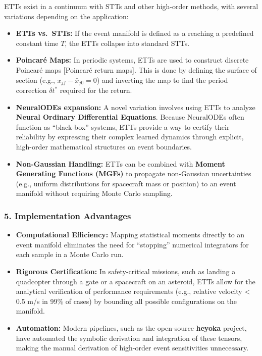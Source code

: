\documentclass[
  letterpaper,
  DIV=11,
  numbers=noendperiod,
  oneside]{scrartcl}
\begin{document}
ETTs exist in a continuum with STTs and other high-order methods, with
several variations depending on the application:

\begin{itemize}
\item
  \textbf{ETTs vs.~STTs:} If the event manifold is defined as a reaching
  a predefined constant time \(T\), the ETTs collapse into standard
  STTs.
\item
  \textbf{Poincaré Maps:} In periodic systems, ETTs are used to
  construct discrete Poincaré maps {[}Poincaré return maps{]}. This is
  done by defining the surface of section (e.g.,
  \(x_{jf} - \bar{x}_{j0} = 0\)) and inverting the map to find the
  period correction \(\delta t^*\) required for the return.
\item
  \textbf{NeuralODEs expansion:} A novel variation involves using ETTs
  to analyze \textbf{Neural Ordinary Differential Equations}. Because
  NeuralODEs often function as ``black-box'' systems, ETTs provide a way
  to certify their reliability by expressing their complex learned
  dynamics through explicit, high-order mathematical structures on event
  boundaries.
\item
  \textbf{Non-Gaussian Handling:} ETTs can be combined with
  \textbf{Moment Generating Functions (MGFs)} to propagate non-Gaussian
  uncertainties (e.g., uniform distributions for spacecraft mass or
  position) to an event manifold without requiring Monte Carlo sampling.
\end{itemize}

\subsubsection{5. Implementation
Advantages}\label{implementation-advantages}

\begin{itemize}
\item
  \textbf{Computational Efficiency:} Mapping statistical moments
  directly to an event manifold eliminates the need for ``stopping''
  numerical integrators for each sample in a Monte Carlo run.
\item
  \textbf{Rigorous Certification:} In safety-critical missions, such as
  landing a quadcopter through a gate or a spacecraft on an asteroid,
  ETTs allow for the analytical verification of performance requirements
  (e.g., relative velocity \textless{} 0.5 m/s in 99\% of cases) by
  bounding all possible configurations on the manifold.
\item
  \textbf{Automation:} Modern pipelines, such as the open-source
  \textbf{heyoka} project, have automated the symbolic derivation and
  integration of these tensors, making the manual derivation of
  high-order event sensitivities unnecessary.
\end{itemize}
\end{document}
